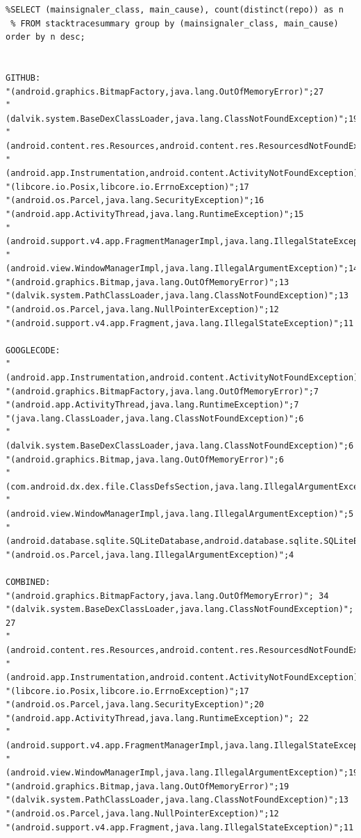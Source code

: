 \documentclass[conference]{IEEEtran}
\begin{document}
{\begin{verbatim}
%SELECT (mainsignaler_class, main_cause), count(distinct(repo)) as n
 % FROM stacktracesummary group by (mainsignaler_class, main_cause) order by n desc;


GITHUB:
"(android.graphics.BitmapFactory,java.lang.OutOfMemoryError)";27
"(dalvik.system.BaseDexClassLoader,java.lang.ClassNotFoundException)";19
"(android.content.res.Resources,android.content.res.ResourcesdNotFoundException)";18
"(android.app.Instrumentation,android.content.ActivityNotFoundException)";17
"(libcore.io.Posix,libcore.io.ErrnoException)";17
"(android.os.Parcel,java.lang.SecurityException)";16
"(android.app.ActivityThread,java.lang.RuntimeException)";15
"(android.support.v4.app.FragmentManagerImpl,java.lang.IllegalStateException)";14
"(android.view.WindowManagerImpl,java.lang.IllegalArgumentException)";14
"(android.graphics.Bitmap,java.lang.OutOfMemoryError)";13
"(dalvik.system.PathClassLoader,java.lang.ClassNotFoundException)";13
"(android.os.Parcel,java.lang.NullPointerException)";12
"(android.support.v4.app.Fragment,java.lang.IllegalStateException)";11

GOOGLECODE:
"(android.app.Instrumentation,android.content.ActivityNotFoundException)";8
"(android.graphics.BitmapFactory,java.lang.OutOfMemoryError)";7
"(android.app.ActivityThread,java.lang.RuntimeException)";7
"(java.lang.ClassLoader,java.lang.ClassNotFoundException)";6
"(dalvik.system.BaseDexClassLoader,java.lang.ClassNotFoundException)";6
"(android.graphics.Bitmap,java.lang.OutOfMemoryError)";6
"(com.android.dx.dex.file.ClassDefsSection,java.lang.IllegalArgumentException)";6
"(android.view.WindowManagerImpl,java.lang.IllegalArgumentException)";5
"(android.database.sqlite.SQLiteDatabase,android.database.sqlite.SQLiteException)";4
"(android.os.Parcel,java.lang.IllegalArgumentException)";4

COMBINED:
"(android.graphics.BitmapFactory,java.lang.OutOfMemoryError)"; 34
"(dalvik.system.BaseDexClassLoader,java.lang.ClassNotFoundException)"; 27
"(android.content.res.Resources,android.content.res.ResourcesdNotFoundException)";18
"(android.app.Instrumentation,android.content.ActivityNotFoundException)";25
"(libcore.io.Posix,libcore.io.ErrnoException)";17
"(android.os.Parcel,java.lang.SecurityException)";20
"(android.app.ActivityThread,java.lang.RuntimeException)"; 22
"(android.support.v4.app.FragmentManagerImpl,java.lang.IllegalStateException)";14
"(android.view.WindowManagerImpl,java.lang.IllegalArgumentException)";19
"(android.graphics.Bitmap,java.lang.OutOfMemoryError)";19
"(dalvik.system.PathClassLoader,java.lang.ClassNotFoundException)";13
"(android.os.Parcel,java.lang.NullPointerException)";12
"(android.support.v4.app.Fragment,java.lang.IllegalStateException)";11


\end{verbatim}}
\end{document}
